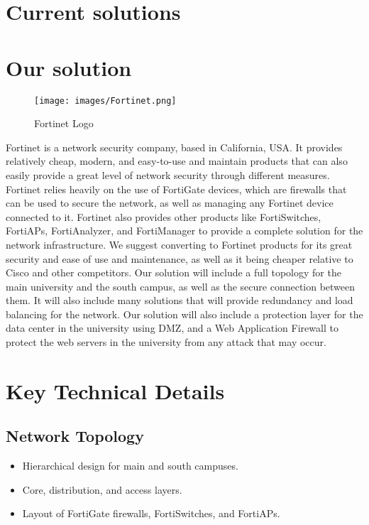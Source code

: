 \documentclass[12pt]{report}
\begin{document}
\section{Current solutions}
\section{Our solution}
\begin{figure}[h]
    \centering
    \texttt{[image: images/Fortinet.png]}
    \caption{Fortinet Logo \cite{FTLogo}}
    \label{fig:fortinet logo}
\end{figure}
Fortinet is a network security company, based in California, USA. It provides relatively cheap, modern, and easy-to-use and maintain products that can also easily provide a great level of network security through different measures. Fortinet relies heavily on the use of FortiGate devices, which are firewalls that can be used to secure the network, as well as managing any Fortinet device connected to it. Fortinet also provides other products like FortiSwitches, FortiAPs, FortiAnalyzer, and FortiManager to provide a complete solution for the network infrastructure. 
We suggest converting to Fortinet products for its great security and ease of use and maintenance, as well as it being cheaper relative to Cisco \cite{Cheaper} and other competitors.
Our solution will include a full topology for the main university and the south campus, as well as the secure connection between them. It will also include many solutions that will provide redundancy and load balancing for the network.
Our solution will also include a protection layer for the data center in the university using DMZ, and a Web Application Firewall to protect the web servers in the university from any attack that may occur.
\section{Key Technical Details}

\subsection{Network Topology}
\begin{itemize}
    \item Hierarchical design for main and south campuses.
    \item Core, distribution, and access layers.
    \item Layout of FortiGate firewalls, FortiSwitches, and FortiAPs.
\end{itemize}
\end{document}
